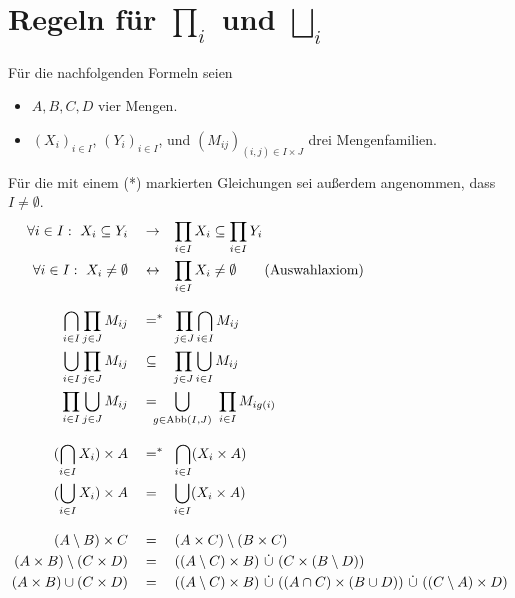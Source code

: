 \section{Regeln für $\prod_i$ und $\bigsqcup_i$} \label{anhang:prodregeln}
Für die nachfolgenden Formeln seien
\begin{itemize}
    \item $A,B,C,D$ vier Mengen.
    \item $(X_i)_{i\in I}$, $(Y_i)_{i\in I}$, und $(M_{ij})_{(i,j)\in I\times J}$ drei Mengenfamilien.
\end{itemize}
Für die mit einem (*) markierten Gleichungen sei außerdem angenommen, dass $I\neq\emptyset$.
\begingroup
\allowdisplaybreaks
\begin{align*}
    \forall i\in I:\ X_i\subseteq Y_i & \quad\to\quad\hspace{-.24em} \smashoperator[l]{\prod_{i\in I}} X_i \subseteq \prod_{i\in I} Y_i \\
    \forall i\in I:\ X_i\neq\emptyset & \quad\leftrightarrow\quad\hspace{-.24em} \smashoperator[l]{\prod_{i\in I}} X_i \neq \emptyset \tag{Auswahlaxiom} \\[0.8em] %
    \bigcap_{i\in I} \prod_{j\in J} M_{ij} & \quad =^* \quad\hspace{-.4em} \smashoperator[l]{\prod_{j \in J}} \bigcap_{i \in I} M_{ij} \\
    \bigcup_{i\in I} \prod_{j\in J} M_{ij} & \quad\subseteq\quad \smashoperator[l]{\prod_{j \in J}} \bigcup_{i\in I} M_{ij} \\
    \prod_{i \in I} \bigcup_{j \in J} M_{ij} & \quad =\quad \smashoperator[l]{\bigcup_{g \in \Abb(I,J)}}\ \prod_{i \in I} M_{ig(i)} \\[0.8em] %
    (\bigcap_{i\in I} X_i ) \times A & \quad =^* \quad\hspace{-.4em} \smashoperator[l]{\bigcap_{i\in I}} ( X_i \times A ) \\
    (\bigcup_{i\in I} X_i ) \times A & \quad = \quad \smashoperator[l]{\bigcup_{i\in I}} ( X_i \times A) \\[0.8em]
    (A \setminus B) \times C & \quad = \quad (A \times C) \setminus (B \times C) \\
    (A \times B) \setminus (C \times D) & \quad = \quad ((A \setminus C) \times B) \ \dot\cup\ (C \times (B \setminus D)) \\ %
    (A \times B) \cup (C \times D) & \quad = \quad ((A \setminus C) \times B)  \ \dot\cup\ ((A \cap C) \times (B \cup D)) \ \dot\cup\ ((C \setminus A) \times D) \\[0.8em] %

\end{align*}
